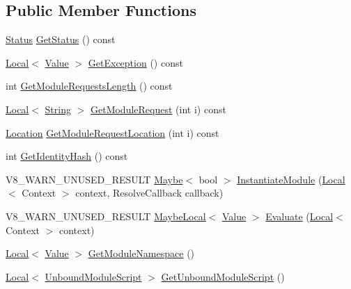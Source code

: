 \subsection*{Public Member Functions}
\begin{DoxyCompactItemize}
\item 
\mbox{\hyperlink{classv8_1_1Module_a9c2a22c9cb8e928d570c38648c648b7e}{Status}} \mbox{\hyperlink{classv8_1_1Module_a6d5b11f191fdb9dc1778ed88333ba2bb}{Get\+Status}} () const
\item 
\mbox{\hyperlink{classv8_1_1Local}{Local}}$<$ \mbox{\hyperlink{classv8_1_1Value}{Value}} $>$ \mbox{\hyperlink{classv8_1_1Module_a74ba40e96b4fd457693f11183ecc1dc4}{Get\+Exception}} () const
\item 
int \mbox{\hyperlink{classv8_1_1Module_a323acfb19889ba4e16b81f1c3d89c2b9}{Get\+Module\+Requests\+Length}} () const
\item 
\mbox{\hyperlink{classv8_1_1Local}{Local}}$<$ \mbox{\hyperlink{classv8_1_1String}{String}} $>$ \mbox{\hyperlink{classv8_1_1Module_a3fc072e8a67c08988740ad652ed928af}{Get\+Module\+Request}} (int i) const
\item 
\mbox{\hyperlink{classv8_1_1Location}{Location}} \mbox{\hyperlink{classv8_1_1Module_a95b5467ac9bcfc120470b6944c7da111}{Get\+Module\+Request\+Location}} (int i) const
\item 
int \mbox{\hyperlink{classv8_1_1Module_aa2966a54ccb783a91ab494407782e9e3}{Get\+Identity\+Hash}} () const
\item 
V8\+\_\+\+W\+A\+R\+N\+\_\+\+U\+N\+U\+S\+E\+D\+\_\+\+R\+E\+S\+U\+LT \mbox{\hyperlink{classv8_1_1Maybe}{Maybe}}$<$ bool $>$ \mbox{\hyperlink{classv8_1_1Module_a2d7d35ce8451c547294fe9964f72d9ca}{Instantiate\+Module}} (\mbox{\hyperlink{classv8_1_1Local}{Local}}$<$ Context $>$ context, Resolve\+Callback callback)
\item 
V8\+\_\+\+W\+A\+R\+N\+\_\+\+U\+N\+U\+S\+E\+D\+\_\+\+R\+E\+S\+U\+LT \mbox{\hyperlink{classv8_1_1MaybeLocal}{Maybe\+Local}}$<$ \mbox{\hyperlink{classv8_1_1Value}{Value}} $>$ \mbox{\hyperlink{classv8_1_1Module_a0785fa83cd3dde1dee086e1f9d31abdc}{Evaluate}} (\mbox{\hyperlink{classv8_1_1Local}{Local}}$<$ Context $>$ context)
\item 
\mbox{\hyperlink{classv8_1_1Local}{Local}}$<$ \mbox{\hyperlink{classv8_1_1Value}{Value}} $>$ \mbox{\hyperlink{classv8_1_1Module_a3fd11de1b44b850f3351b2765f32da68}{Get\+Module\+Namespace}} ()
\item 
\mbox{\hyperlink{classv8_1_1Local}{Local}}$<$ \mbox{\hyperlink{classv8_1_1UnboundModuleScript}{Unbound\+Module\+Script}} $>$ \mbox{\hyperlink{classv8_1_1Module_a47dc498d5645eef50ddceb874f5ed3a1}{Get\+Unbound\+Module\+Script}} ()
\end{DoxyCompactItemize}


